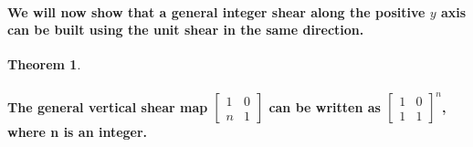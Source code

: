 \documentclass{report}
\newtheorem{theorem}{Theorem}[chapter]
\begin{document}
\paragraph{We will now show that a general integer shear along the positive $y$ axis can be built using the unit shear in the same direction.}

\begin{theorem}
{\paragraph{The general vertical shear map
$\begin{bmatrix}
1&0\\n&1
\end{bmatrix}$
can be written as
$\begin{bmatrix}
1&0\\1&1
\end{bmatrix}^n$,
where n is an integer.
}}
\end{theorem}
\end{document}
